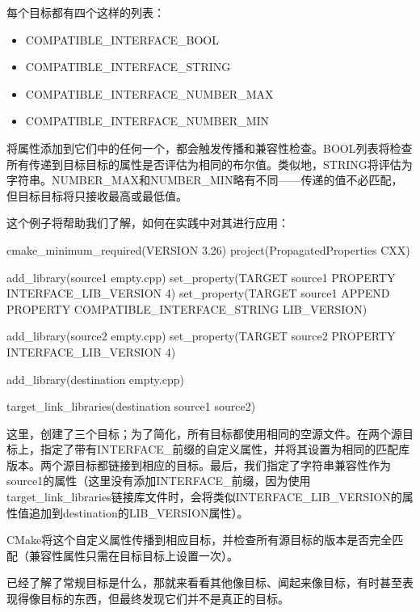 每个目标都有四个这样的列表：

\begin{itemize}
\item
COMPATIBLE\_INTERFACE\_BOOL

\item
COMPATIBLE\_INTERFACE\_STRING

\item
COMPATIBLE\_INTERFACE\_NUMBER\_MAX

\item
COMPATIBLE\_INTERFACE\_NUMBER\_MIN
\end{itemize}

将属性添加到它们中的任何一个，都会触发传播和兼容性检查。BOOL列表将检查所有传递到目标目标的属性是否评估为相同的布尔值。类似地，STRING将评估为字符串。NUMBER\_MAX和NUMBER\_MIN略有不同——传递的值不必匹配，但目标目标将只接收最高或最低值。

这个例子将帮助我们了解，如何在实践中对其进行应用：


\begin{cmake}
cmake_minimum_required(VERSION 3.26)
project(PropagatedProperties CXX)

add_library(source1 empty.cpp)
set_property(TARGET source1 PROPERTY INTERFACE_LIB_VERSION 4)
set_property(TARGET source1 APPEND PROPERTY
             COMPATIBLE_INTERFACE_STRING LIB_VERSION)

add_library(source2 empty.cpp)
set_property(TARGET source2 PROPERTY INTERFACE_LIB_VERSION 4)

add_library(destination empty.cpp)

target_link_libraries(destination source1 source2)
\end{cmake}

这里，创建了三个目标；为了简化，所有目标都使用相同的空源文件。在两个源目标上，指定了带有INTERFACE\_前缀的自定义属性，并将其设置为相同的匹配库版本。两个源目标都链接到相应的目标。最后，我们指定了字符串兼容性作为source1的属性（这里没有添加INTERFACE\_前缀，因为使用target_link\_libraries链接库文件时，会将类似INTERFACE\_LIB\_VERSION的属性值追加到destination的LIB\_VERSION属性）。

CMake将这个自定义属性传播到相应目标，并检查所有源目标的版本是否完全匹配（兼容性属性只需在目标目标上设置一次）。

已经了解了常规目标是什么，那就来看看其他像目标、闻起来像目标，有时甚至表现得像目标的东西，但最终发现它们并不是真正的目标。


